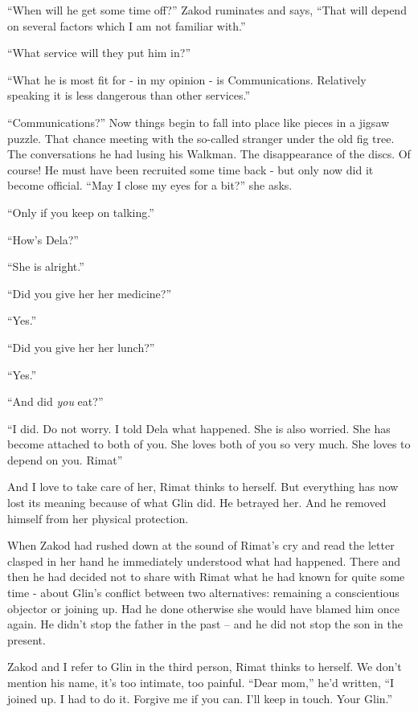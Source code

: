 \documentclass[twoside,11pt]{book}
\begin{document}
 ``When will he get some time off?'' Zakod ruminates and says, ``That will depend on several factors
which I am not familiar with.''

``What service will they put him in?''

``What he is most fit for - in my opinion - is Communications. Relatively speaking it is less dangerous than other
services.''

``Communications?'' Now things begin to fall into place like pieces in a jigsaw puzzle. That chance meeting with the
so-called stranger under the old fig tree. The conversations he had lusing his Walkman. The disappearance of the discs.
Of course! He must have been recruited some time back - but only now did it become official. ``May I close my eyes
for a bit?'' she asks.

``Only if you keep on talking.''

``How's Dela?''

``She is alright.''

``Did you give her her medicine?''

``Yes.''

``Did you give her her lunch?''

``Yes.''

``And did \textit{you} eat?''

``I did. Do not worry. I told Dela what happened. She is also worried.  She has become attached to both of you. She
loves both of you so very much. She loves to depend on you. Rimat''

And I love to take care of her, Rimat thinks to herself. But everything has now lost its meaning because of what Glin
did. He betrayed her. And he removed himself from her physical protection.

When Zakod had rushed down at the sound of Rimat's cry and read the letter clasped in her hand he
immediately understood what had happened. There and then he had decided not to share with Rimat what
he had known for quite some time - about Glin's conflict between two alternatives:  remaining a conscientious objector
or joining up. Had he done otherwise she would have blamed him once again. He didn't stop the father in the past -- and
he did not stop the son in the present.

Zakod and I refer to Glin in the third person, Rimat thinks to herself. We don't mention his name, it's too
intimate, too painful. ``Dear mom,'' he'd written, ``I joined up. I had to do it. Forgive me if you
can. I'll keep in touch. Your Glin.''
\end{document}
